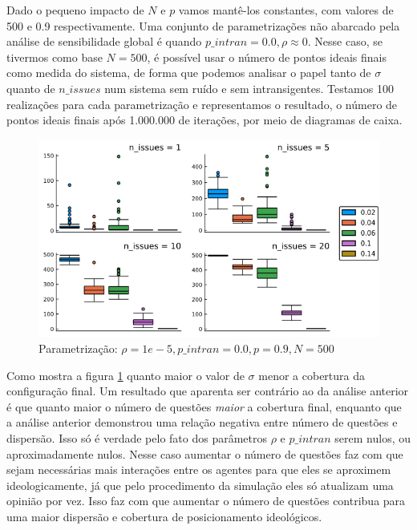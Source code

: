     Dado o pequeno impacto de \(N\) e \(p\) vamos mantê-los constantes, com
    valores de 500 e 0.9 respectivamente. Uma conjunto de parametrizações não
    abarcado pela análise de sensibilidade global é quando \(p\_intran = 0.0, \rho \approx
    0 \). Nesse caso, se tivermos como base \(N = 500\), é possível usar o
    número de pontos ideais finais como medida do sistema, de forma que podemos
    analisar o papel tanto de \(\sigma\) quanto de \(n\_issues\) num sistema sem
    ruído e sem intransigentes. Testamos 100 realizações para cada
    parametrização e representamos o resultado, o número de pontos ideais finais
    após 1.000.000 de iterações, por meio de diagramas de caixa.
    
  \begin{figure}[H]
    \centering
    \includegraphics[scale=0.7]{ims/boxes4.png}
    \caption{Parametrização: \(\rho =1e-5, p\_intran = 0.0, p = 0.9, N =500\)}
    \label{fig:box4}
  \end{figure}
  
  Como mostra a figura \ref{fig:box4} quanto maior o valor de \(\sigma\) menor a
  cobertura da configuração final. Um resultado que aparenta ser contrário ao da
  análise anterior é que quanto maior o número de questões \textit{maior} a
  cobertura final, enquanto que a análise anterior demonstrou uma relação
  negativa entre número de questões e dispersão. Isso só é verdade pelo fato dos
  parâmetros \(\rho\) e \(p\_intran\) serem nulos, ou aproximadamente nulos. Nesse
  caso aumentar o número de questões faz com que sejam necessárias mais
  interações entre os agentes para que eles se aproximem ideologicamente, já que
  pelo procedimento da simulação eles só atualizam uma opinião por vez. Isso faz
  com que aumentar o número de questões contribua para uma maior dispersão e
  cobertura de posicionamento ideológicos.
  
